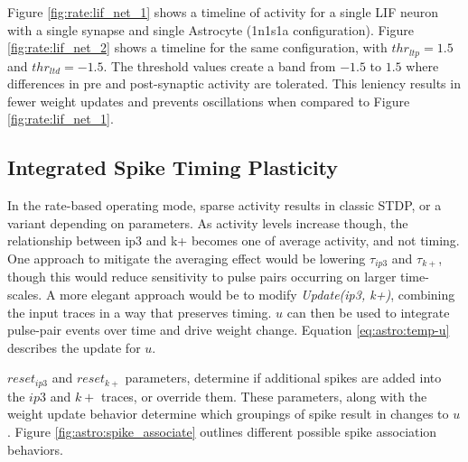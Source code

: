     Figure \ref{fig:rate:lif_net_1} shows a timeline of activity for a single
    LIF neuron with a single synapse and single Astrocyte (1n1s1a
    configuration). Figure \ref{fig:rate:lif_net_2} shows a timeline for the
    same configuration, with $thr_{ltp}=1.5$ and $thr_{ltd}=-1.5$. The threshold
    values create a band from $-1.5$ to $1.5$ where differences in pre and
    post-synaptic activity are tolerated. This leniency results in fewer weight
    updates and prevents oscillations when compared to Figure
    \ref{fig:rate:lif_net_1}.

    
    
 
    \subsection{Integrated Spike Timing Plasticity}
    
    In the rate-based operating mode, sparse activity results in classic STDP,
    or a variant depending on parameters. As activity levels increase though,
    the relationship between ip3 and k+ becomes one of average activity, and not
    timing. One approach to mitigate the averaging effect would be lowering
    $\tau_{ip3}$ and $\tau_{k+}$, though this would reduce sensitivity to pulse
    pairs occurring on larger time-scales. A more elegant approach would be to
    modify \emph{Update(ip3, k+)}, combining the input traces in a way that
    preserves timing. $u$ can then be used to integrate pulse-pair events over
    time and drive weight change. Equation \ref{eq:astro:temp-u} describes the
    update for $u$.

    $reset_{ip3}$ and $reset_{k+}$ parameters, determine if additional spikes
    are added into the $ip3$ and $k+$ traces, or override them. These
    parameters, along with the weight update behavior determine which groupings
    of spike result in changes to $u$. Figure \ref{fig:astro:spike_associate}
    outlines different possible spike association behaviors.


